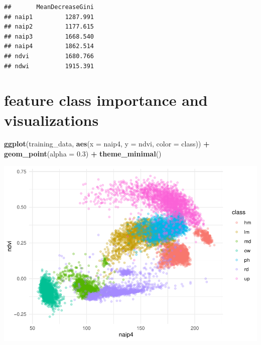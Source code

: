 \documentclass[
]{article}
\newenvironment{Shaded}{\begin{snugshade}}{\end{snugshade}}
\newcommand{\AttributeTok}[1]{\textcolor[rgb]{0.13,0.29,0.53}{#1}}
\newcommand{\CommentTok}[1]{\textcolor[rgb]{0.56,0.35,0.01}{\textit{#1}}}
\newcommand{\FloatTok}[1]{\textcolor[rgb]{0.00,0.00,0.81}{#1}}
\newcommand{\FunctionTok}[1]{\textcolor[rgb]{0.13,0.29,0.53}{\textbf{#1}}}
\newcommand{\NormalTok}[1]{#1}
\newcommand{\OtherTok}[1]{\textcolor[rgb]{0.56,0.35,0.01}{#1}}
\newcommand{\SpecialCharTok}[1]{\textcolor[rgb]{0.81,0.36,0.00}{\textbf{#1}}}
\begin{document}
\begin{Shaded}
\end{Shaded}

\begin{verbatim}
##       MeanDecreaseGini
## naip1         1287.991
## naip2         1177.615
## naip3         1668.540
## naip4         1862.514
## ndvi          1680.766
## ndwi          1915.391
\end{verbatim}

\section{feature class importance and
visualizations}\label{feature-class-importance-and-visualizations-1}

\begin{Shaded}
\begin{Highlighting}[]
\FunctionTok{ggplot}\NormalTok{(training\_data, }\FunctionTok{aes}\NormalTok{(}\AttributeTok{x =}\NormalTok{ naip4, }\AttributeTok{y =}\NormalTok{ ndvi, }\AttributeTok{color =}\NormalTok{ class)) }\SpecialCharTok{+}
  \FunctionTok{geom\_point}\NormalTok{(}\AttributeTok{alpha =} \FloatTok{0.3}\NormalTok{) }\SpecialCharTok{+}
  \FunctionTok{theme\_minimal}\NormalTok{()}
\end{Highlighting}
\end{Shaded}

\includegraphics{veg_model_new_class_files/figure-latex/unnamed-chunk-9-1.pdf}
\end{document}
